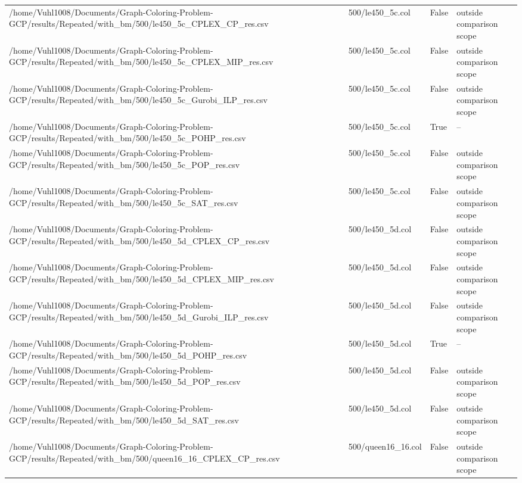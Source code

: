 \begin{table}[htbp]
\begin{tabular}{llll}
/home/Vuhl1008/Documents/Graph-Coloring-Problem-GCP/results/Repeated/with\_bm/500/le450\_5c\_CPLEX\_CP\_res.csv & 500/le450\_5c.col & False & outside comparison scope \\
/home/Vuhl1008/Documents/Graph-Coloring-Problem-GCP/results/Repeated/with\_bm/500/le450\_5c\_CPLEX\_MIP\_res.csv & 500/le450\_5c.col & False & outside comparison scope \\
/home/Vuhl1008/Documents/Graph-Coloring-Problem-GCP/results/Repeated/with\_bm/500/le450\_5c\_Gurobi\_ILP\_res.csv & 500/le450\_5c.col & False & outside comparison scope \\
/home/Vuhl1008/Documents/Graph-Coloring-Problem-GCP/results/Repeated/with\_bm/500/le450\_5c\_POHP\_res.csv & 500/le450\_5c.col & True & -- \\
/home/Vuhl1008/Documents/Graph-Coloring-Problem-GCP/results/Repeated/with\_bm/500/le450\_5c\_POP\_res.csv & 500/le450\_5c.col & False & outside comparison scope \\
/home/Vuhl1008/Documents/Graph-Coloring-Problem-GCP/results/Repeated/with\_bm/500/le450\_5c\_SAT\_res.csv & 500/le450\_5c.col & False & outside comparison scope \\
/home/Vuhl1008/Documents/Graph-Coloring-Problem-GCP/results/Repeated/with\_bm/500/le450\_5d\_CPLEX\_CP\_res.csv & 500/le450\_5d.col & False & outside comparison scope \\
/home/Vuhl1008/Documents/Graph-Coloring-Problem-GCP/results/Repeated/with\_bm/500/le450\_5d\_CPLEX\_MIP\_res.csv & 500/le450\_5d.col & False & outside comparison scope \\
/home/Vuhl1008/Documents/Graph-Coloring-Problem-GCP/results/Repeated/with\_bm/500/le450\_5d\_Gurobi\_ILP\_res.csv & 500/le450\_5d.col & False & outside comparison scope \\
/home/Vuhl1008/Documents/Graph-Coloring-Problem-GCP/results/Repeated/with\_bm/500/le450\_5d\_POHP\_res.csv & 500/le450\_5d.col & True & -- \\
/home/Vuhl1008/Documents/Graph-Coloring-Problem-GCP/results/Repeated/with\_bm/500/le450\_5d\_POP\_res.csv & 500/le450\_5d.col & False & outside comparison scope \\
/home/Vuhl1008/Documents/Graph-Coloring-Problem-GCP/results/Repeated/with\_bm/500/le450\_5d\_SAT\_res.csv & 500/le450\_5d.col & False & outside comparison scope \\
/home/Vuhl1008/Documents/Graph-Coloring-Problem-GCP/results/Repeated/with\_bm/500/queen16\_16\_CPLEX\_CP\_res.csv & 500/queen16\_16.col & False & outside comparison scope \\

\end{tabular}
\end{table}
